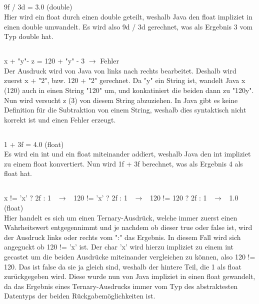 \documentclass[12pt]{article}
\begin{document}
\subsection{}
\begin{center}
    9f / 3d = 3.0 (double)\\
    Hier wird ein float durch einen double geteilt, weshalb Java den float impliziet in einen double umwandelt. Es wird also 9d / 3d gerechnet, was als Ergebnis 3 vom Typ double hat.
\end{center}
\pagebreak

\subsection{}
\begin{center}
    x + "y"- z = 120 + "y" - 3 $\rightarrow$ Fehler\\
    Der Ausdruck wird von Java von links nach rechts bearbeitet. Deshalb wird zuerst x + "2", bzw. 120 + "2" gerechnet. Da "y" ein String ist, wandelt Java x (120) auch in einen String "120" um, und konkatiniert die beiden dann zu "120y". Nun wird versucht z (3) von diesem String abzuziehen. In Java gibt es keine Definition für die Subtraktion von einem String, weshalb dies syntaktisch nicht korrekt ist und einen Fehler erzeugt.
\end{center}

\subsection{}
\begin{center}
    1 + 3f = 4.0 (float)\\
    Es wird ein int und ein float miteinander addiert, weshalb Java den int impliziet zu einem float konvertiert. Nun wird 1f + 3f berechnet, was als Ergebnis 4 als float hat.
\end{center}

\subsection{}
\begin{center}
    x != 'x' ? 2f : 1 $\enspace\rightarrow\enspace$ 120 != 'x' ? 2f : 1 $\enspace\rightarrow\enspace$ 120 != 120 ? 2f : 1 $\enspace\rightarrow\enspace$ 1.0 (float)\\
    Hier handelt es sich um einen Ternary-Ausdrück, welche immer zuerst einen Wahrheitswert entgegennimmt und je nachdem ob dieser true oder false ist, wird der Ausdruck links oder rechts vom ":" das Ergebnis.
    In diesem Fall wird sich angeguckt ob 120 != 'x' ist. Der char 'x' wird hierzu impliziet zu einem int gecastet um die beiden Ausdrücke miteinander vergleichen zu können, also 120 != 120. Das ist false da sie ja gleich sind, weshalb der hintere Teil, die 1 als float zurückgegeben wird. Diese wurde nun von Java impliziet in einen float gewandelt, da das Ergebnis eines Ternary-Ausdrucks immer vom Typ des abstraktesten Datentyps der beiden Rückgabemöglichkeiten ist.
\end{center}
\pagebreak
\end{document}
